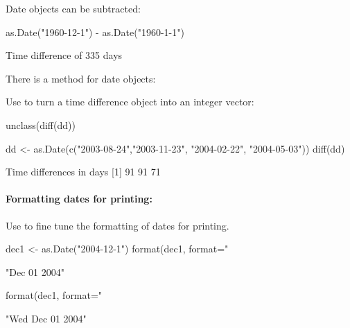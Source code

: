 Date objects can be subtracted:
\begin{Schunk}
\begin{Sinput}
as.Date("1960-12-1") - as.Date("1960-1-1")
\end{Sinput}
\begin{Soutput}
Time difference of 335 days
\end{Soutput}
\end{Schunk}
There is a  method for date objects:
\begin{marginfigure}[12pt]
Use  to turn a time difference object into an
integer vector:
\begin{Schunk}
\begin{Sinput}
unclass(diff(dd))
\end{Sinput}
\end{Schunk}
\end{marginfigure}
\begin{Schunk}
\begin{Sinput}
dd <- as.Date(c("2003-08-24","2003-11-23",
                "2004-02-22", "2004-05-03"))
diff(dd)
\end{Sinput}
\begin{Soutput}
Time differences in days
[1] 91 91 71
\end{Soutput}
\end{Schunk}

\paragraph{Formatting dates for printing:}
Use  to fine tune the formatting
of dates for printing.
\begin{Schunk}
\begin{Sinput}
dec1 <- as.Date("2004-12-1")
format(dec1, format="%
\end{Sinput}
\begin{Soutput}
[1] "Dec 01 2004"
\end{Soutput}
\begin{Sinput}
format(dec1, format="%
\end{Sinput}
\begin{Soutput}
[1] "Wed Dec 01 2004"
\end{Soutput}
\end{Schunk}

